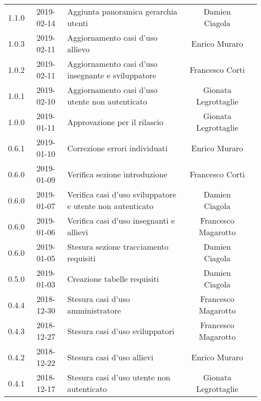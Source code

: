{\begin{longtable}{ c c C{6cm} c c }
		1.1.0 &
		2019-02-14 &
		Aggiunta panoramica gerarchia utenti&
		Damien Ciagola&
		\reda{} \\
		
		1.0.3 &
		2019-02-11 &
		Aggiornamento casi d'uso allievo&
		Enrico Muraro&
		\reda{} \\
		
		1.0.2 &
		2019-02-11 &
		Aggiornamento casi d'uso insegnante e sviluppatore&
		Francesco Corti&
		\reda{} \\

		1.0.1 &
		2019-02-10 &
		Aggiornamento casi d'uso utente non autenticato&
		Gionata Legrottaglie&
		\reda{} \\

		1.0.0 &
		2019-01-11 &
		Approvazione per il rilascio &	
		Gionata Legrottaglie&	
		\Res{} \\
		
		0.6.1 & 
		2019-01-10 &  
		Correzione errori individuati &	
		Enrico Muraro&	
		\reda{} \\
		
		0.6.0 & 
		2019-01-09 &  
		Verifica sezione introduzione &	
		Francesco Corti&	
		\ver{} \\
		
		0.6.0 & 
		2019-01-07 &  
		Verifica casi d'uso sviluppatore e utente non autenticato& 	
		Damien Ciagola  &	
		\ver{} \\
		
		0.6.0 & 
		2019-01-06 &  
		Verifica casi d'uso insegnanti e allievi & 
		Francesco Magarotto  &
		\ver{}  \\
		
		0.6.0 & 
		2019-01-05 &  
		Stesura sezione tracciamento requisiti &	
		Damien Ciagola &	
		\reda{} \\
		
		0.5.0 & 
		2019-01-03 &  
		Creazione tabelle requisiti&	
		Damien Ciagola &	
		\reda{} \\
		
		0.4.4 & 
		2018-12-30 &  
		Stesura casi d'uso amministratore &	
		Francesco Magarotto &	
		\reda{} \\
		
		0.4.3 & 
		2018-12-27 &  
		Stesura casi d'uso sviluppatori &	
		Francesco Magarotto &	
		\reda{} \\
		
		0.4.2 & 
		2018-12-22 &  
		Stesura casi d'uso allievi &	
		Enrico Muraro	&	
		\reda{} \\	
		
		0.4.1 & 
		2018-12-17 &  
		Stesura casi d'uso utente non autenticato &	
		Gionata Legrottaglie &	
		\reda{} \\
		

\end{longtable}}
